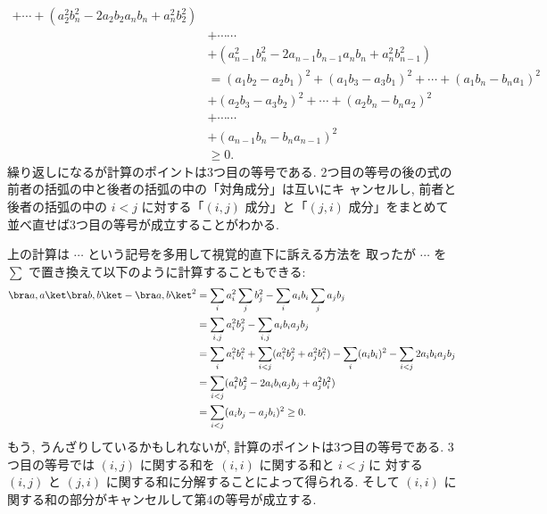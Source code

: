 \documentclass[12pt,twoside]{jarticle}
\begin{document}
{\begin{align*}
  + \cdots
  + (a_2^2b_n^2 - 2a_2b_2a_nb_n + a_n^2b_2^2)
  \\ &
  + \cdots\cdots
  \\ &
  + (a_{n-1}^2b_n^2 - 2a_{n-1}b_{n-1}a_nb_n + a_n^2b_{n-1}^2)
  \\ &
  = (a_1b_2 - a_2b_1)^2
  + (a_1b_3 - a_3b_1)^2
  + \cdots
  + (a_1b_n - b_na_1)^2
  \\ &
  + (a_2b_3 - a_3b_2)^2
  + \cdots
  + (a_2b_n - b_na_2)^2
  \\ &
  + \cdots\cdots
  \\ &
  + (a_{n-1}b_n - b_na_{n-1})^2
  \\ &
  \ge 0.
\end{align*}
}繰り返しになるが計算のポイントは3つ目の等号である.
2つ目の等号の後の式の前者の括弧の中と後者の括弧の中の「対角成分」は互いにキ
ャンセルし, 前者と後者の括弧の中の $i<j$ に対する「$(i,j)$ 成分」と「$(j,i)$ 
成分」をまとめて並べ直せば3つ目の等号が成立することがわかる.

上の計算は $\cdots$ という記号を多用して視覚的直下に訴える方法を
取ったが $\cdots$ を $\sum$ で置き換えて以下のように計算することもできる:
\begin{align*}
  \bra a,a\ket \bra b,b\ket - \bra a,b\ket^2
  &
  = \sum_i a_i^2 \sum_j b_j^2
  - \sum_i a_ib_i \sum_j a_jb_j
  \\ &
  = \sum_{i,j} a_i^2b_j^2
  - \sum_{i,j} a_ib_ia_jb_j
  \\ &
  = \sum_i a_i^2b_i^2 + \sum_{i<j}(a_i^2b_j^2 + a_j^2b_i^2)
  - \sum_i (a_ib_i)^2 - \sum_{i<j} 2a_ib_ia_jb_j
  \\ &
  = \sum_{i<j}(a_i^2b_j^2 - 2a_ib_ia_jb_j + a_j^2b_i^2)
  \\ &
  = \sum_{i<j}(a_ib_j - a_jb_i)^2
  \ge 0.
\end{align*}
もう, うんざりしているかもしれないが, 計算のポイントは3つ目の等号である.
3つ目の等号では $(i,j)$ に関する和を $(i,i)$ に関する和と $i<j$ に
対する $(i,j)$ と $(j,i)$ に関する和に分解することによって得られる.
そして $(i,i)$ に関する和の部分がキャンセルして第4の等号が成立する.
\end{document}
